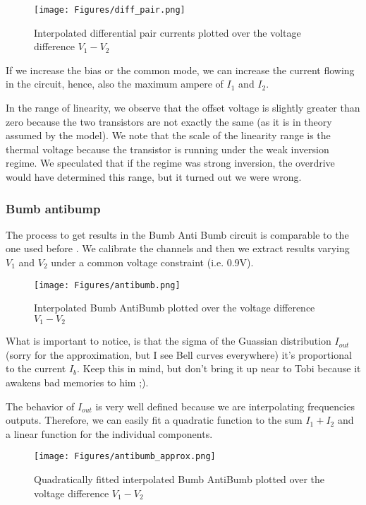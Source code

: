\begin{figure}[H]
    \centering
    \texttt{[image: Figures/diff\_pair.png]}
    \caption{Interpolated differential pair currents plotted over the voltage difference $V_1-V_2$}
    \label{fig:basalandcerebellum}
\end{figure}

If we increase the bias or the common mode, we can increase the current flowing in the circuit, hence, also the maximum ampere of $I_1$ and $I_2$. 

In the range of linearity, we observe that the offset voltage is slightly greater than zero because the two transistors are not exactly the same (as it is in theory assumed by the model). 
We note that the scale of the linearity range is the thermal voltage because the transistor is running under the weak inversion regime.
We speculated that if the regime was strong inversion, the overdrive would have determined this range, but it turned out we were wrong.  

\subsubsection{Bumb antibump}

The process to get results in the Bumb Anti Bumb circuit is comparable to the one used before \label{lab:diffpair}. We calibrate the channels and then we extract results varying $V_1$ and $V_2$ under a common voltage constraint (i.e. 0.9V). 

\begin{figure}[H]
    \centering
    \texttt{[image: Figures/antibumb.png]}
    \caption{Interpolated Bumb AntiBumb plotted over the voltage difference $V_1-V_2$}
    \label{fig:basalandcerebellum}
\end{figure}

What is important to notice, is that the sigma of the Guassian distribution $I_{out}$ (sorry for the approximation, but I see Bell curves everywhere) it's proportional to the current $I_b$. Keep this in mind, but don't bring it up near to Tobi because it awakens bad memories to him ;).  

The behavior of $I_{out}$ is very well defined because we are interpolating frequencies outputs. Therefore, we can easily fit a quadratic function to the sum $I_1+I_2$ and a linear function for the individual components.

\begin{figure}[H]
    \centering
    \texttt{[image: Figures/antibumb\_approx.png]}
    \caption{Quadratically fitted interpolated Bumb AntiBumb plotted over the voltage difference $V_1-V_2$}
    \label{fig:basalandcerebellum}
\end{figure}



